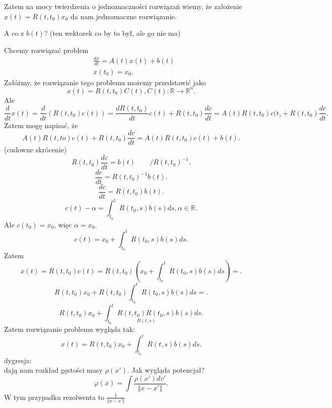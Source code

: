 \documentclass[../main.tex]{subfiles}
\begin{document}
    Zatem na mocy twierdzenia o jednoznaczności rozwiązań wiemy, że założenie $x(t) = R(t,t_0)x_0$ da nam jednoznaczne rozwiązanie.
    \begin{pytanie}
        A co z $b(t)$? (ten wektorek co by to był, ale go nie ma)
    \end{pytanie}
    Chcemy rozwiązać problem
    \begin{align*}
        &\frac{dx}{dt}=A(t)x(t)+b(t)\\
        &x(t_0)=x_0
    .\end{align*}
    Załóżmy, że rozwiązanie tego problemu możemy przedstawić jako
    \[
        x(t) = R(t,t_0)C(t), C(t):\mathbb{R}\to\mathbb{R}^n
    .\]
    Ale
    \[
        \frac{d}{dt}x(t) = \frac{d}{dt} \left( R(t,t_0)c(t) \right) = \frac{dR(t,t_0)}{dt}c(t)+R(t,t_0)\frac{dc}{dt} = A(t)R(t,t_0)c(t_)+R(t,t_0)\frac{dc}{dt}
    .\]
    Zatem mogę napisać, że
    \[
        A(t)R(t,to)c(t)+R(t,t_0)\frac{dc}{dt}=A(t)R(t,t_0)c(t)+b(t)
    .\](cudowne skrócenie)
    \[
        R(t,t_0)\frac{dc}{dt}=b(t) \quad\quad/R(t,t_0)^{-1}
    .\]
    \[
        \frac{dc}{dt}=R(t,t_0)^{-1}b(t)
    .\]
    \[
        \frac{dc}{dt} = R(t,t_0)b(t)
    .\]
    \[
        c(t) -\alpha = \int_{t_0}^t R(t_0,s)b(s) ds, \alpha\in\mathbb{R}
    .\]
    Ale $c(t_0)=x_0$, więc $\alpha = x_0$.
    \[
        c(t) = x_0+\int_{t_0}^t R(t_0,s)b(s)ds
    .\]
    Zatem
    \[
        x(t) = R(t,t_0)c(t) = R(t,t_0)\left( x_0+\int_{t_0}^t R(t_0,s)b(s)ds \right)  =
    .\]
    \[
        R(t,t_0)x_0+R(t,t_0)\int_{t_0}^t R(t_0,s)b(s)ds =
    .\]
    \[
        R(t,t_0)x_0+\int_{t_0}^t \underset{R(t,s)}{R(t,t_0)R(t_0,s)}b(s)ds
    .\]
    Zatem rozwiązanie problemu wygląda tak:
    \[
        x(t) = R(t,t_0)x_0+\int_{t_0}^t R(t,s)b(s)ds
    .\]
    dygresja:\\
    dają nam rozkład gęstości masy $\rho(x')$. Jak wygląda potencjał?
     \[
         \varphi(x) = \int \frac{\rho(x') dv'}{\Vert x-x' \Vert }
    .\]
    W tym przypadku rezolwenta to $\frac{1}{\Vert x-x' \Vert }$\\
\end{document}
